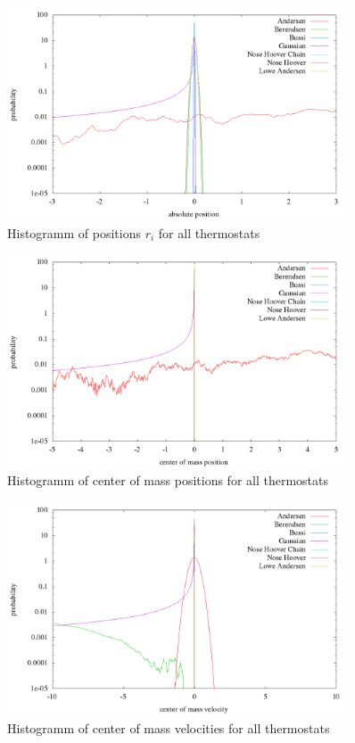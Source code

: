 \begin{figure}[H]
\centering
\includegraphics[width=0.9\textwidth]{./graphics/Histogramm_absPosition_one_T=20_p=64.png}
\caption{Histogramm of positions $r_i$ for all thermostats}
\label{im:absPos_one}
\end{figure} 

\begin{figure}[H]
\centering
\includegraphics[width=0.9\textwidth]{./graphics/Histogramm_schwerPos_one_T=20_p=64.png}
\caption{Histogramm of center of mass positions for all thermostats}
\label{im:schwerPos_one}
\end{figure} 

\begin{figure}[H]
\centering
\includegraphics[width=0.9\textwidth]{./graphics/Histogramm_schwerVel_one_T=20_p=64.png}
\caption{Histogramm of center of mass velocities for all thermostats}
\label{im:schwerVel_one}
\end{figure} 

